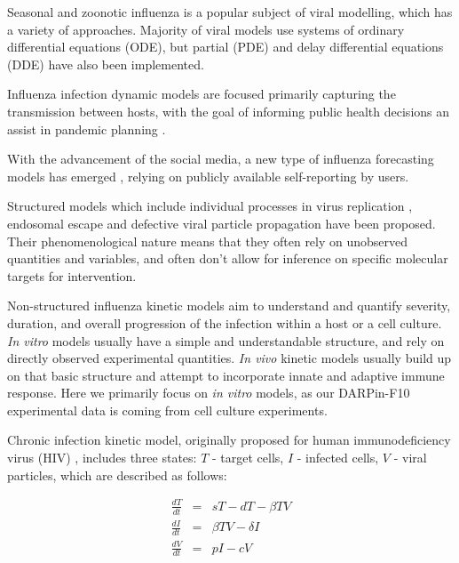 Seasonal and zoonotic influenza is a popular subject of viral modelling, which has a variety of approaches. Majority of viral models use systems of ordinary differential equations (ODE), but partial (PDE) and delay differential equations (DDE) have also been implemented.

Influenza infection dynamic models are focused primarily capturing the transmission between hosts, with the goal of informing public health decisions an assist in pandemic planning \cite{ferguson2006strategies, mcvernon2007model}.

With the advancement of the social media, a new type of influenza forecasting models has emerged \cite{pawelek2014modeling, santillana2015combining}, relying on publicly available self-reporting by users.

Structured models which include individual processes in virus replication \cite{sidorenko2004structured}, endosomal escape \cite{lagache2012modeling} and defective viral particle propagation \cite{rudiger2019multiscale} have been proposed. Their phenomenological nature means that they often rely on unobserved quantities and variables, and often don't allow for inference on specific molecular targets for intervention.

Non-structured influenza kinetic models aim to understand and quantify severity, duration, and overall progression of the infection within a host or a cell culture. \textit{In vitro} models usually have a simple and understandable structure, and rely on directly observed experimental quantities. \textit{In vivo} kinetic models usually build up on that basic structure and attempt to incorporate innate \cite{beauchemin2008modeling} and adaptive \cite{belz2002compromised} immune response. Here we primarily focus on \textit{in vitro} models, as our DARPin-F10 experimental data is coming from cell culture experiments.

Chronic infection kinetic model, originally proposed for human immunodeficiency virus (HIV) \cite{perelson2002modelling}, includes three states: $T$ - target cells, $I$ - infected cells, $V$ - viral particles, which are described as follows:

\begin{equation}
\begin{array}{rcl}
\frac{dT}{dt} &=& s T - d T - \beta T V \\
\frac{dI}{dt} &=& \beta T V - \delta I \\
\frac{dV}{dt} &=& p I - c V
\end{array}
\end{equation}

